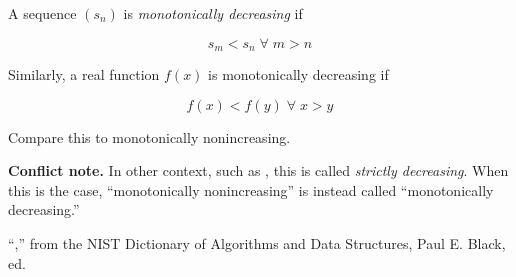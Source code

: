 \documentclass[12pt]{article}
\begin{document}
A sequence $(s_n)$ is \emph{monotonically decreasing} if 

$$ s_m < s_n \;\forall\; m > n $$

Similarly, a real function $f(x)$ is monotonically decreasing if

$$ f(x) < f(y) \;\forall\; x > y$$

Compare this to monotonically nonincreasing.

\textbf{Conflict note.} In other context, such as \cite{NIST}, this is called \emph{strictly decreasing}.  When this is the case, ``monotonically nonincreasing'' is instead called ``monotonically decreasing.'' 

\begin{thebibliography}{3}
  ``,'' from the NIST Dictionary of Algorithms and Data Structures, Paul E. Black, ed.
\end{thebibliography}
\end{document}
